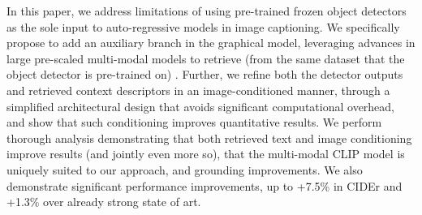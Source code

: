\documentclass[10pt,twocolumn,letterpaper]{article}
\begin{document}
In this paper, we address limitations of using pre-trained frozen object detectors as the sole input to auto-regressive models in image captioning. We specifically propose to add an auxiliary branch in the graphical model, leveraging advances in large pre-scaled multi-modal models to retrieve (from the same dataset that the object detector is pre-trained on) . Further, we refine both the detector outputs and retrieved context descriptors in an image-conditioned manner, through a simplified architectural design that avoids significant computational overhead, and show that such conditioning improves quantitative results.
We perform thorough analysis demonstrating that both retrieved text and image conditioning improve results (and jointly even more so), that the multi-modal CLIP model is uniquely suited to our approach, and  grounding improvements.
We also demonstrate significant performance improvements, up to +7.5\% in CIDEr and +1.3\% over already strong state of art. 

{\small


}
\end{document}
